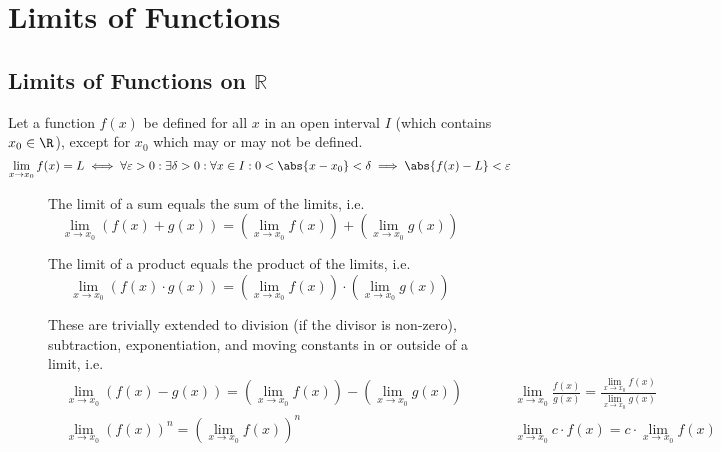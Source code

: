 \documentclass{article}
\begin{document}
\section{Limits of Functions}
\subsection{Limits of Functions on \texorpdfstring{$\mathbb{R}$}{the Reals}}
\begin{definition}
    Let a function $f(x)$ be defined for all $x$ in an open interval $I$
    (which contains $x_0 \in \R$), except for $x_0$ which may or may not be defined.
    \begin{equation*}
        \lim_{x\to x_0} f(x) = L \iff \forall\varepsilon>0: \exists\delta>0: \forall x \in I: 0<\abs{x-x_0}<\delta \implies \abs{f(x)-L}<\varepsilon
    \end{equation*}
\end{definition}
%
\begin{figure}[H]
    \begin{mdframed}[style=exampledefault,frametitle={Limit Laws for Functions}]
        \begin{theorem} The limit of a sum equals the sum of the limits, i.e.
            \begin{equation*}
                \lim_{x\to x_0}\left(f(x)+g(x)\right)
                = \left(\lim_{x\to x_0}f(x)\right) + \left(\lim_{x\to x_0}g(x)\right)
            \end{equation*}
        \end{theorem}
        \begin{theorem} The limit of a product equals the product of the limits, i.e.
            \begin{equation*}
                \lim_{x\to x_0}\left(f(x)\cdot g(x)\right)
                = \left(\lim_{x\to x_0}f(x)\right) \cdot \left(\lim_{x\to x_0}g(x)\right)
            \end{equation*}
        \end{theorem}
        These are trivially extended to
        division (if the divisor is non-zero),
        subtraction, exponentiation, and moving constants in or outside of a limit, i.e.
        \begin{align*}
             & \lim_{x\to x_0}\left(f(x) - g(x)\right)
            = \left(\lim_{x\to x_0}f(x)\right) - \left(\lim_{x\to x_0}g(x)\right)
             & \qquad
             & \lim_{x\to x_0}\frac{f(x)}{g(x)}
            = \frac{\lim_{x\to x_0}f(x)}{\lim_{x\to x_0}g(x)}
            \\
             & \lim_{x\to x_0}\left(f(x)\right)^n
            = \left(\lim_{x\to x_0}f(x)\right)^n
             & \qquad
             & \lim_{x\to x_0} c \cdot f(x)
            = c \cdot \lim_{x\to x_0}f(x)
        \end{align*}
    \end{mdframed}
\end{figure}
\end{document}
